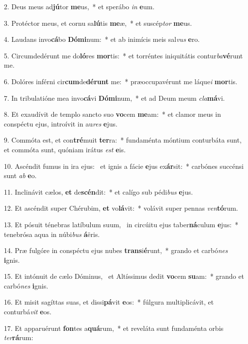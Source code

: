2. Deus meus ad\textbf{jú}tor \textbf{me}us,~*  et sperábo \textit{in} \textbf{e}um.\

3. Protéctor meus, et cornu sa\textbf{lú}tis \textbf{me}æ,~*  et suscép\textit{tor} \textbf{me}us.\

4. Laudans invo\textbf{cá}bo \textbf{Dó}\textbf{mi}num:~*  et ab inimícis meis sal\textit{vus} \textbf{e}ro.\

5. Circumdedérunt me do\textbf{ló}res \textbf{mor}tis:~*  et torréntes iniquitátis contur\textit{ba}\textbf{vé}runt me.\

6. Dolóres inférni cir\textbf{cum}de\textbf{dé}\textbf{runt} me:~*  præoccupavérunt me láque\textit{i} \textbf{mor}tis.\

7. In tribulatióne mea invo\textbf{cá}vi \textbf{Dó}\textbf{mi}num,~*  et ad Deum meum \textit{cla}\textbf{má}vi.\

8. Et exaudívit de templo sancto suo \textbf{vo}cem \textbf{me}am:~*  et clamor meus in conspéctu ejus, introívit in au\textit{res} \textbf{e}jus.\

9. Commóta est, et con\textbf{tré}muit \textbf{ter}ra:~*  fundaménta móntium conturbáta sunt, et commóta sunt, quóniam irátus \textit{est} \textbf{e}is.\

10. Ascéndit fumus in ira ejus: \dag\  et ignis a fácie \textbf{e}jus ex\textbf{ár}sit:~*  carbónes succénsi sunt \textit{ab} \textbf{e}o.\

11. Inclinávit cælos, \textbf{et} de\textbf{scén}dit:~*  et calígo sub pédi\textit{bus} \textbf{e}jus.\

12. Et ascéndit super Chérubim, \textbf{et} vo\textbf{lá}vit:~*  volávit super pennas \textit{ven}\textbf{tó}rum.\

13. Et pósuit ténebras latíbulum suum, \dag\  in circúitu ejus taber\textbf{ná}culum \textbf{e}jus:~*  tenebrósa aqua in núbi\textit{bus} \textbf{á}ëris.\

14. Præ fulgóre in conspéctu ejus nubes \textbf{trans}i\textbf{é}runt,~*  grando et carbó\textit{nes} \textbf{i}gnis.\

15. Et intónuit de cælo Dóminus, \dag\  et Altíssimus dedit \textbf{vo}cem \textbf{su}am:~*  grando et carbó\textit{nes} \textbf{i}gnis.\

16. Et misit sagíttas suas, et dissi\textbf{pá}vit \textbf{e}os:~*  fúlgura multiplicávit, et conturbá\textit{vit} \textbf{e}os.\

17. Et apparuérunt \textbf{fon}tes a\textbf{quá}rum,~*  et reveláta sunt fundaménta orbis \textit{ter}\textbf{rá}rum:\

